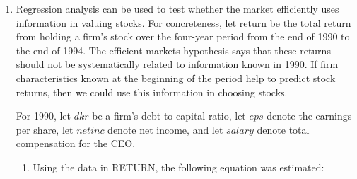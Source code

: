 \documentclass[12pt]{article}
\begin{document}
\begin{enumerate}
{\begin{enumerate}
    \item  The coefficient on \textit{totwrk} is $-0.148$ in the original model and $-0.151$ in the restricted model. The change is small and not substantial. Thus, including \textit{educ} and \textit{age} does not greatly affect the estimated tradeoff between sleeping and working.

    \item If the sleep equation contains heteroskedasticity, the standard errors reported in the regression output are likely biased and inconsistent. This means the $t$-tests and $F$-tests in parts (a) and (b) may be invalid. Specifically, the test statistics might not follow the assumed distributions, leading to potentially incorrect conclusions. To address this, heteroskedasticity-robust standard errors should be used when conducting hypothesis tests.

\end{enumerate}

}



\item Regression analysis can be used to test whether the market efficiently uses information in valuing stocks. For concreteness, let return be the total return from holding a firm's stock over the four-year period from the end of 1990 to the end of 1994. The efficient markets hypothesis says that these returns should not be systematically related to information known in 1990. If firm characteristics known at the beginning of the period help to predict stock returns, then we could use this information in choosing stocks.

For 1990, let $d k r$ be a firm's debt to capital ratio, let $eps$ denote the earnings per share, let $netinc$ denote net income, and let $salary$ denote total compensation for the CEO.

\begin{enumerate}
    \item Using the data in RETURN, the following equation was estimated:


\end{enumerate}
\end{enumerate}
\end{document}
